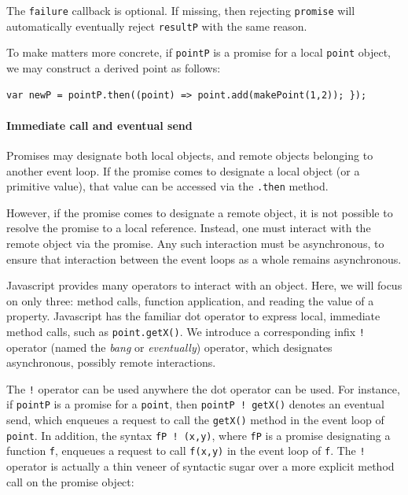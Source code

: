 \documentclass{llncs}
\begin{document}
The \texttt{failure} callback is optional. If missing, then rejecting \texttt{promise} will automatically eventually reject \texttt{resultP} with the same reason.

To make matters more concrete, if \texttt{pointP} is a promise for a local \texttt{point} object, we may construct a derived point as follows:

\begin{verbatim}
var newP = pointP.then((point) => point.add(makePoint(1,2)); });
\end{verbatim}

\paragraph{Immediate call and eventual send}

Promises may designate both local objects, and remote objects belonging to another event loop. If the promise comes to designate a local object (or a primitive value), that value can be accessed via the \texttt{.then} method.

However, if the promise comes to designate a remote object, it is not possible to resolve the promise to a local reference. Instead, one must interact with the remote object via the promise. Any such interaction must be asynchronous, to ensure that interaction between the event loops as a whole remains asynchronous.

Javascript provides many operators to interact with an object. Here, we will focus on only three: method calls, function application, and reading the value of a property. Javascript has the familiar dot operator to express local, immediate method calls, such as \texttt{point.getX()}. We introduce a corresponding infix \texttt{!} operator (named the \emph{bang} or \emph{eventually}) operator, which designates asynchronous, possibly remote interactions.

The \texttt{!} operator can be used anywhere the dot operator can be used. For instance, if \texttt{pointP} is a promise for a \texttt{point}, then \texttt{pointP ! getX()} denotes an eventual send, which enqueues a request to call the \texttt{getX()} method in the event loop of \texttt{point}. In addition, the syntax \texttt{fP ! (x,y)}, where \texttt{fP} is a promise designating a function \texttt{f}, enqueues a request to call \texttt{f(x,y)} in the event loop of \texttt{f}. The \texttt{!} operator is actually a thin veneer of syntactic sugar over a more explicit method call on the promise object:
\end{document}
